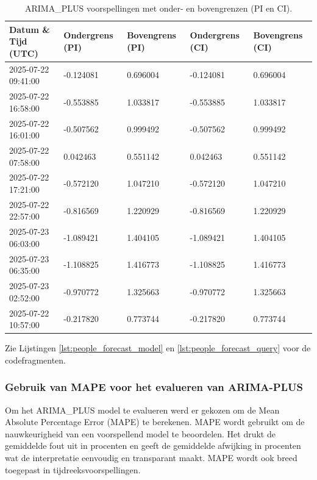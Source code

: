 \begin{table}[H]
    \small
    \begin{tabular}{|p{3.5cm}|p{3cm}|p{3cm}|p{3cm}|p{3cm}|}
        \hline
        \textbf{Datum \& Tijd (UTC)} & \textbf{Ondergrens (PI)} & \textbf{Bovengrens (PI)} & \textbf{Ondergrens (CI)} & \textbf{Bovengrens (CI)} \\
        \hline
        2025-07-22 09:41:00 & -0.124081 & 0.696004 & -0.124081 & 0.696004 \\
        2025-07-22 16:58:00 & -0.553885 & 1.033817 & -0.553885 & 1.033817 \\
        2025-07-22 16:01:00 & -0.507562 & 0.999492 & -0.507562 & 0.999492 \\
        2025-07-22 07:58:00 & 0.042463  & 0.551142 & 0.042463  & 0.551142 \\
        2025-07-22 17:21:00 & -0.572120 & 1.047210 & -0.572120 & 1.047210 \\
        2025-07-22 22:57:00 & -0.816569 & 1.220929 & -0.816569 & 1.220929 \\
        2025-07-23 06:03:00 & -1.089421 & 1.404105 & -1.089421 & 1.404105 \\
        2025-07-23 06:35:00 & -1.108825 & 1.416773 & -1.108825 & 1.416773 \\
        2025-07-23 02:52:00 & -0.970772 & 1.325663 & -0.970772 & 1.325663 \\
        2025-07-22 10:57:00 & -0.217820 & 0.773744 & -0.217820 & 0.773744 \\
        \hline
    \end{tabular}
    \caption{ARIMA\_PLUS voorspellingen met onder- en bovengrenzen (PI en CI).}
    \label{tab:voorspellingen_b}
\end{table}



Zie Lijstingen \ref{lst:people_forecast_model} en \ref{lst:people_forecast_query} voor de codefragmenten.

\subsubsection{Gebruik van MAPE voor het evalueren van ARIMA-PLUS}
Om het ARIMA\_PLUS model te evalueren werd er gekozen om de Mean Absolute Percentage Error (MAPE) te berekenen. MAPE wordt gebruikt om de nauwkeurigheid van een voorspellend model te beoordelen. Het drukt de gemiddelde fout uit in procenten en geeft de gemiddelde afwijking in procenten wat de interpretatie eenvoudig en transparant maakt. MAPE wordt ook breed toegepast in tijdreeksvoorspellingen.

